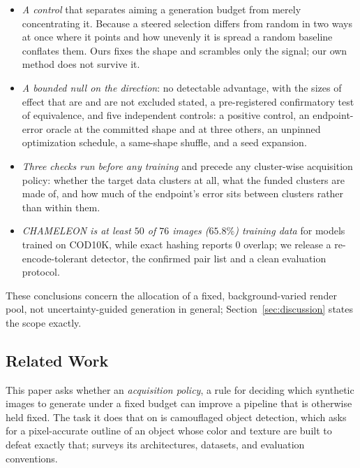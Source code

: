 \documentclass{article}
\newif\ifrevmarked \revmarkedtrue
\DeclareRobustCommand{\revB}[1]{\ifrevmarked{\color{RevB}#1}\else{#1}\fi}
\DeclareRobustCommand{\revC}[1]{\ifrevmarked{\color{RevC}#1}\else{#1}\fi}
\DeclareRobustCommand{\revShared}[1]{\ifrevmarked{\color{RevShared}#1}\else{#1}\fi}
\begin{document}
\begin{itemize}
\item \textit{A control} that separates aiming a generation budget from merely concentrating it. Because a steered selection differs from random in two ways at once where it points and how unevenly it is spread a random baseline conflates them. Ours fixes the shape and scrambles only the signal; our own method does not survive it.
\item \textit{A bounded null on the direction}: \revShared{no detectable advantage, with the sizes of effect that are and are
not excluded stated, a pre-registered confirmatory test of equivalence,} and five independent controls: a positive control, \revB{an endpoint-error oracle at the committed shape and at three others}, an unpinned
optimization schedule, a same-shape shuffle, and a seed expansion.
\item \textit{Three checks run before any training} and precede any cluster-wise acquisition
policy: whether the target data clusters at all, what the funded clusters are made of, and how much of the endpoint's error sits between clusters rather than within them.
\item \textit{CHAMELEON is \revC{at least} $50$ of $76$ images ($65.8\%$) training data} for models trained on
COD10K, while exact hashing reports $0$ overlap; we release a re-encode-tolerant detector, the
confirmed pair list and a clean evaluation protocol.
\end{itemize}
\revShared{These conclusions concern the allocation of a fixed, background-varied render pool, not uncertainty-guided generation
in general; Section~\ref{sec:discussion} states the scope exactly.}


\subsection{Related Work}
\label{sec:related}
This paper asks whether an \emph{acquisition policy}, a rule for
deciding which synthetic images to generate under a fixed budget can improve a pipeline that is
otherwise held fixed. The task it does that on is camouflaged object detection, which asks for a
pixel-accurate outline of an object whose color and texture are built to defeat exactly that;
\citet{fan2023advances} surveys its architectures, datasets, and evaluation conventions.
\end{document}
